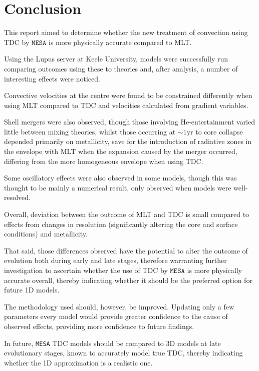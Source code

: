 \section{Conclusion} \label{sec:Conclusion}

This report aimed to determine whether the new treatment of convection using \gls{TDC} by $\texttt{MESA}$ is more physically accurate compared to \gls{MLT}.

Using the Lupus server at Keele University, models were successfully run comparing outcomes using these to theories and, after analysis, a number of interesting effects were noticed.

Convective velocities at the centre were found to be constrained differently when using \gls{MLT} compared to \gls{TDC} and velocities calculated from gradient variables. 

Shell mergers were also observed, though those involving He-entertainment varied little between mixing theories, whilst those occurring at $\sim 1\mathrm{yr}$ to core collapse depended primarily on metallicity, save for the introduction of radiative zones in the envelope with \gls{MLT} when the expansion caused by the merger occurred, differing from the more homogeneous envelope when using \gls{TDC}.

Some oscillatory effects were also observed in some models, though this was thought to be mainly a numerical result, only observed when models were well-resolved. 

Overall, deviation between the outcome of \gls{MLT} and \gls{TDC} is small compared to effects from changes in resolution (significantly altering the core and surface conditions) and metallicity.

That said, those differences observed have the potential to alter the outcome of evolution both during early and late stages, therefore warranting further investigation to ascertain whether the use of \gls{TDC} by $\texttt{MESA}$ is more physically accurate overall, thereby indicating whether it should be the preferred option for future 1D models. 

The methodology used should, however, be improved. Updating only a few parameters every model would provide greater confidence to the cause of observed effects, providing more confidence to future findings. 

In future, \texttt{MESA} \gls{TDC} models should be compared to 3D models at late evolutionary stages, known to accurately model true \gls{TDC}, thereby indicating whether the 1D approximation is a realistic one.